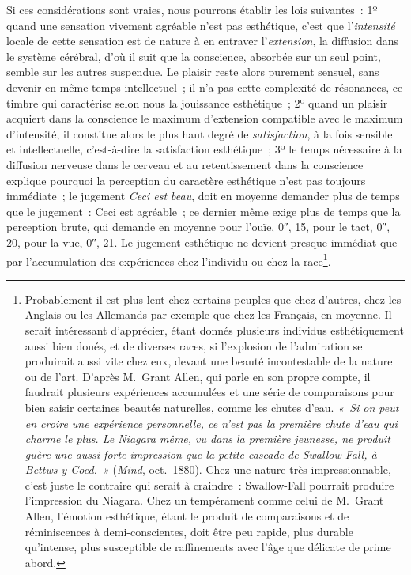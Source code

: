 \documentclass[french,twoside]{book} %
\newcommand\foreign[1]{\emph{#1}}
\begin{document}
Si ces considérations sont vraies, nous pourrons établir les lois suivantes : 1º quand une sensation vivement agréable n’est pas esthétique, c’est que l’\emph{intensité} locale de cette sensation est de nature à en entraver l’\emph{extension}, la diffusion dans le système cérébral, d’où il suit que la  conscience, absorbée sur un seul point, semble sur les autres suspendue. Le plaisir reste alors purement sensuel, sans devenir en même temps intellectuel ; il n’a pas cette complexité de résonances, ce timbre qui caractérise selon nous la jouissance esthétique ; 2º quand un plaisir acquiert dans la conscience le maximum d’extension compatible avec le maximum d’intensité, il constitue alors le plus haut degré de \emph{satisfaction}, à la fois sensible et intellectuelle, c’est-à-dire la satisfaction esthétique ; 3º le temps nécessaire à la diffusion nerveuse dans le cerveau et au retentissement dans la conscience explique pourquoi la perception du caractère esthétique n’est pas toujours immédiate ; le jugement \emph{Ceci est beau}, doit en moyenne demander plus de temps que le jugement : Ceci est agréable ; ce dernier même exige plus de temps que la perception brute, qui demande en moyenne pour l’ouïe, 0″, 15, pour le tact, 0″, 20, pour la vue, 0″, 21. Le jugement esthétique ne devient presque immédiat que par l’accumulation des expériences chez l’individu ou chez la race\footnote{Probablement il est plus lent chez certains peuples que chez d’autres, chez les Anglais ou les Allemands par exemple que chez les Français, en moyenne. Il serait intéressant d’apprécier, étant donnés plusieurs individus esthétiquement aussi bien doués, et de diverses races, si l’explosion de l’admiration se produirait aussi vite chez eux, devant une beauté incontestable de la nature ou de l’art. D’après M. Grant Allen, qui parle en son propre compte, il faudrait plusieurs expériences accumulées et une série de comparaisons pour bien saisir certaines beautés naturelles, comme les chutes d’eau. \emph{« Si on peut en croire une expérience personnelle, ce n’est pas la première chute d’eau qui charme le plus. Le Niagara même, vu dans la première jeunesse, ne produit guère une aussi forte impression que la petite cascade de Swallow-Fall, à Bettws-y-Coed. »} (\foreign{\emph{Mind}}, oct. 1880). Chez une nature très impressionnable, c’est juste le contraire qui serait à craindre : Swallow-Fall pourrait produire l’impression du Niagara. Chez un tempérament comme celui de M. Grant Allen, l’émotion esthétique, étant le produit de comparaisons et de réminiscences à demi-conscientes, doit être peu rapide, plus durable qu’intense, plus susceptible de raffinements avec l’âge que délicate de prime abord.}.\par
\end{document}
